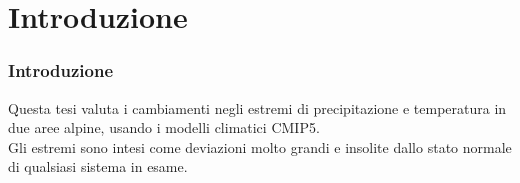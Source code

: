 \section{Introduzione}

\begin{frame}
\frametitle{Introduzione}
Questa tesi valuta i cambiamenti negli estremi di precipitazione e temperatura in due aree alpine, usando i modelli climatici CMIP5.\\
\vspace{0.5cm}
Gli estremi sono intesi come deviazioni molto grandi e insolite dallo stato normale di qualsiasi sistema in esame.
\end{frame}